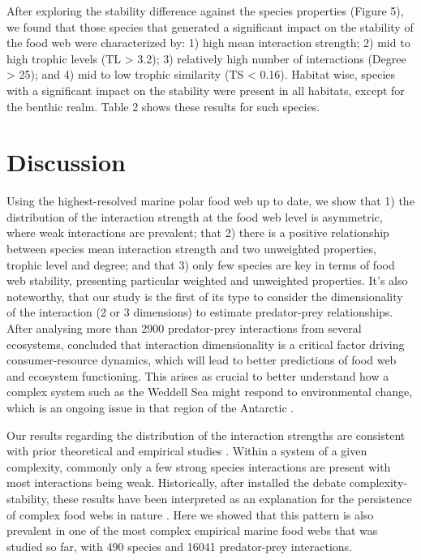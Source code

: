 \documentclass[gc, manuscript]{copernicus}
\begin{document}
After exploring the stability difference against the species properties
(Figure 5), we found that those species that generated a significant
impact on the stability of the food web were characterized by: 1) high
mean interaction strength; 2) mid to high trophic levels (TL
\textgreater{} 3.2); 3) relatively high number of interactions (Degree
\textgreater{} 25); and 4) mid to low trophic similarity (TS \textless{}
0.16). Habitat wise, species with a significant impact on the stability
were present in all habitats, except for the benthic realm. Table 2
shows these results for such species.

\section{Discussion}

Using the highest-resolved marine polar food web up to date, we show
that 1) the distribution of the interaction strength at the food web
level is asymmetric, where weak interactions are prevalent; that 2)
there is a positive relationship between species mean interaction
strength and two unweighted properties, trophic level and degree; and
that 3) only few species are key in terms of food web stability,
presenting particular weighted and unweighted properties. It's also
noteworthy, that our study is the first of its type to consider the
dimensionality of the interaction (2 or 3 dimensions) to estimate
predator-prey relationships. After analysing more than 2900
predator-prey interactions from several ecosystems, \citet{Pawar2012}
concluded that interaction dimensionality is a critical factor driving
consumer-resource dynamics, which will lead to better predictions of
food web and ecosystem functioning. This arises as crucial to better
understand how a complex system such as the Weddell Sea might respond to
environmental change, which is an ongoing issue in that region of the
Antarctic \citep[ and references herein]{Gutt2022}.

Our results regarding the distribution of the interaction strengths are
consistent with prior theoretical and empirical studies
\citep[e.g.][]{McCann1998, Neutel2002, Emmerson2004, Wootton2005}.
Within a system of a given complexity, commonly only a few strong
species interactions are present with most interactions being weak.
Historically, after \citet{May1972} installed the debate
complexity-stability, these results have been interpreted as an
explanation for the persistence of complex food webs in nature
\citep{Bascompte2005, Allesina2015, Nilsson2016}. Here we showed that
this pattern is also prevalent in one of the most complex empirical
marine food webs that was studied so far, with 490 species and 16041
predator-prey interactions.
\end{document}
